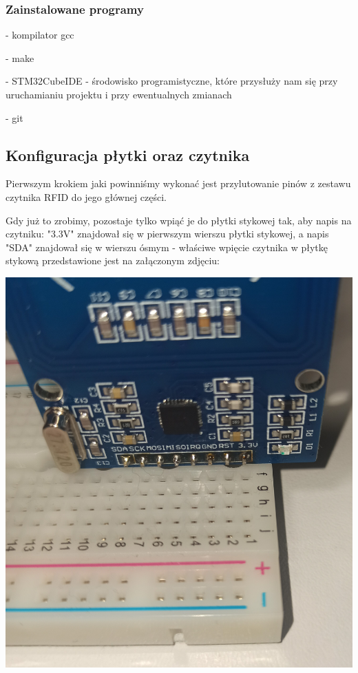 \documentclass[12pt,hidelinks]{article}
\begin{document}
    \subsubsection{Zainstalowane programy}

    - kompilator gcc

    - make

    - STM32CubeIDE - środowisko programistyczne, które przysłuży nam się przy uruchamianiu projektu i przy ewentualnych zmianach

    - git

    \newpage

    \subsection{Konfiguracja płytki oraz czytnika}
    Pierwszym krokiem jaki powinniśmy wykonać jest przylutowanie pinów z zestawu czytnika RFID do jego głównej części.

    \vskip 0.2in

    Gdy już to zrobimy, pozostaje tylko wpiąć je do płytki stykowej tak, aby napis na czytniku: "3.3V" znajdował się w pierwszym wierszu płytki stykowej, a napis "SDA" znajdował się w wierszu ósmym - właściwe wpięcie czytnika w płytkę stykową przedstawione jest na załączonym zdjęciu:

    \begin{center}
        \includegraphics[scale=0.22]{img/contact_plate_reader.jpg}
    \end{center}
\end{document}
